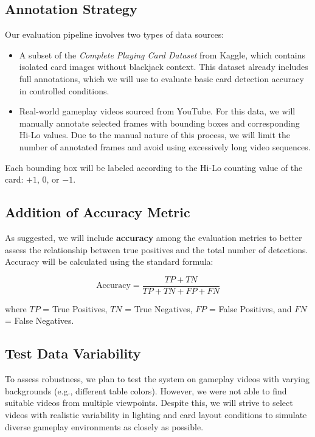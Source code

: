 \documentclass{article}
\begin{document}
\subsection*{Annotation Strategy}

Our evaluation pipeline involves two types of data sources:

\begin{itemize}
    \item A subset of the \textit{Complete Playing Card Dataset} from Kaggle, which contains isolated card images without blackjack context. This dataset already includes full annotations, which we will use to evaluate basic card detection accuracy in controlled conditions.
    
    \item Real-world gameplay videos sourced from YouTube. For this data, we will manually annotate selected frames with bounding boxes and corresponding Hi-Lo values. Due to the manual nature of this process, we will limit the number of annotated frames and avoid using excessively long video sequences.
\end{itemize}

Each bounding box will be labeled according to the Hi-Lo counting value of the card: $+1$, $0$, or $-1$.

\subsection*{Addition of Accuracy Metric}

As suggested, we will include \textbf{accuracy} among the evaluation metrics to better assess the relationship between true positives and the total number of detections. Accuracy will be calculated using the standard formula:

\[
\text{Accuracy} = \frac{TP + TN}{TP + TN + FP + FN}
\]

where $TP$ = True Positives, $TN$ = True Negatives, $FP$ = False Positives, and $FN$ = False Negatives.

\subsection*{Test Data Variability}

To assess robustness, we plan to test the system on gameplay videos with varying backgrounds (e.g., different table colors). However, we were not able to find suitable videos from multiple viewpoints. Despite this, we will strive to select videos with realistic variability in lighting and card layout conditions to simulate diverse gameplay environments as closely as possible.
\end{document}
